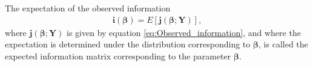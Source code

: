 \begin{definition} 
\label{def:expected_information}
The expectation of the observed information 
\begin{align}
    \textbf{i}(\boldsymbol{\beta}) = E[\textbf{j}(\boldsymbol{\beta};\textbf{Y})],
\end{align}
where $\textbf{j}(\boldsymbol{\beta};\textbf{Y})$ is given by equation \eqref{eq:Observed_information}, and where the expectation is determined under the distribution corresponding to $\boldsymbol{\beta}$, is called the expected information matrix corresponding to the parameter $\boldsymbol{\beta}$.
\end{definition}

